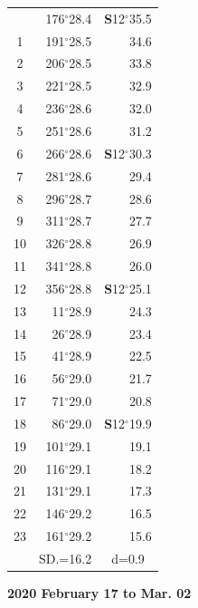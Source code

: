 \documentclass[10pt, a4paper]{report}
\begin{document}
\begin{scriptsize}
\begin{tabular*}{0.2\textwidth}[t]{@{\extracolsep{\fill}}|c|rr|}
\hline\rule{0pt}{2.6ex}\noindent
0 & 176$^\circ$28.4 & \textbf{S}12$^\circ$35.5\\
1 & 191$^\circ$28.5 & 34.6\\
2 & 206$^\circ$28.5 & 33.8\\
3 & 221$^\circ$28.5 & \raisebox{0.24ex}{\boldmath$\cdot$~\boldmath$\cdot$~~}32.9\\
4 & 236$^\circ$28.6 & 32.0\\
5 & 251$^\circ$28.6 & 31.2\\[2Pt]
6 & 266$^\circ$28.6 & \textbf{S}12$^\circ$30.3\\
7 & 281$^\circ$28.6 & 29.4\\
8 & 296$^\circ$28.7 & 28.6\\
9 & 311$^\circ$28.7 & \raisebox{0.24ex}{\boldmath$\cdot$~\boldmath$\cdot$~~}27.7\\
10 & 326$^\circ$28.8 & 26.9\\
11 & 341$^\circ$28.8 & 26.0\\[2Pt]
12 & 356$^\circ$28.8 & \textbf{S}12$^\circ$25.1\\
13 & 11$^\circ$28.9 & 24.3\\
14 & 26$^\circ$28.9 & 23.4\\
15 & 41$^\circ$28.9 & \raisebox{0.24ex}{\boldmath$\cdot$~\boldmath$\cdot$~~}22.5\\
16 & 56$^\circ$29.0 & 21.7\\
17 & 71$^\circ$29.0 & 20.8\\[2Pt]
18 & 86$^\circ$29.0 & \textbf{S}12$^\circ$19.9\\
19 & 101$^\circ$29.1 & 19.1\\
20 & 116$^\circ$29.1 & 18.2\\
21 & 131$^\circ$29.1 & \raisebox{0.24ex}{\boldmath$\cdot$~\boldmath$\cdot$~~}17.3\\
22 & 146$^\circ$29.2 & 16.5\\
23 & 161$^\circ$29.2 & 15.6\\
\hline
\rule{0pt}{2.4ex} & \multicolumn{1}{c}{SD.=16.2} & \multicolumn{1}{c|}{d=0.9}\\
\hline
\end{tabular*}

\end{scriptsize}
\newpage
\sffamily
\noindent
\begin{flushright}
\textbf{2020 February 17 to Mar. 02}\par
\end{flushright}
\end{document}

